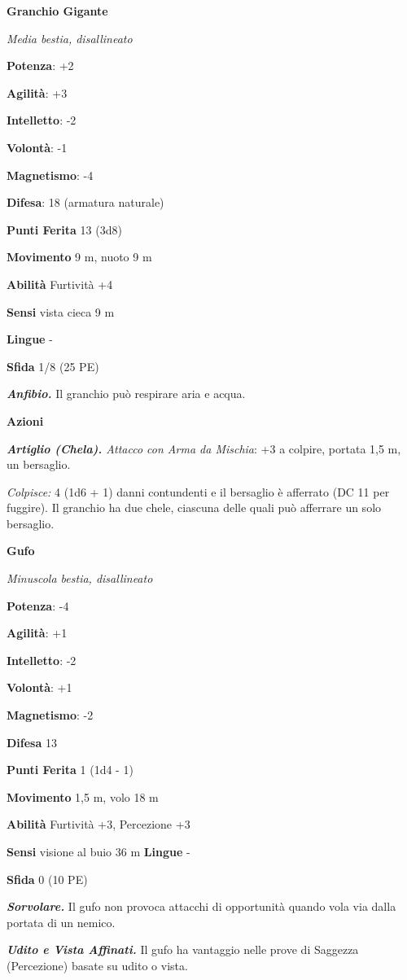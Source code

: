 \begin{multicols}{2}
\textbf{Granchio Gigante}

\emph{Media bestia, disallineato}

\textbf{Potenza}: +2

\textbf{Agilità}: +3

\textbf{Intelletto}: -2

\textbf{Volontà}: -1

\textbf{Magnetismo}: -4

\textbf{Difesa}: 18 (armatura naturale)

\textbf{Punti Ferita} 13 (3d8)

\textbf{Movimento} 9 m, nuoto 9 m

\textbf{Abilità} Furtività +4

\textbf{Sensi} vista cieca 9 m

\textbf{Lingue} -

\textbf{Sfida} 1/8 (25 PE)

\emph{\textbf{Anfibio.}} Il granchio può respirare aria e acqua.

\textbf{Azioni}

\emph{\textbf{Artiglio (Chela).} Attacco con Arma da Mischia}: +3 a
colpire, portata 1,5 m, un bersaglio.

\emph{Colpisce:} 4 (1d6 + 1) danni contundenti e il bersaglio è
afferrato (DC 11 per fuggire). Il granchio ha due chele, ciascuna delle
quali può afferrare un solo bersaglio.

\textbf{Gufo}

\emph{Minuscola bestia, disallineato}

\textbf{Potenza}: -4

\textbf{Agilità}: +1

\textbf{Intelletto}: -2

\textbf{Volontà}: +1

\textbf{Magnetismo}: -2

\textbf{Difesa} 13

\textbf{Punti Ferita} 1 (1d4 - 1)

\textbf{Movimento} 1,5 m, volo 18 m

\textbf{Abilità} Furtività +3, Percezione +3

\textbf{Sensi} visione al buio 36 m
\textbf{Lingue} -

\textbf{Sfida} 0 (10 PE)

\emph{\textbf{Sorvolare.}} Il gufo non provoca attacchi di opportunità
quando vola via dalla portata di un nemico.

\emph{\textbf{Udito e Vista Affinati.}} Il gufo ha vantaggio nelle prove
di Saggezza (Percezione) basate su udito o vista.


\end{multicols}
